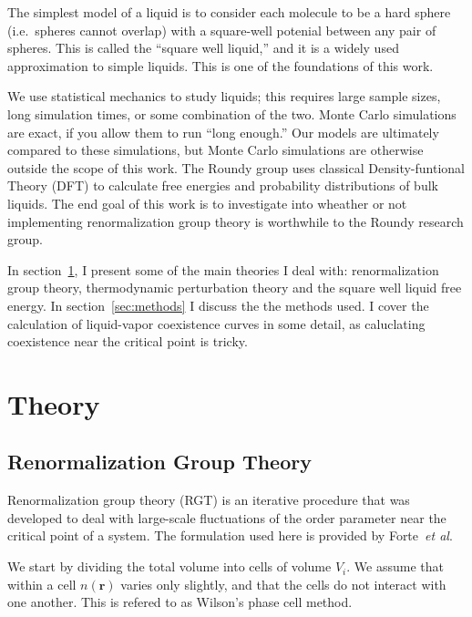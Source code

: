 \documentclass[letterpaper,twocolumn,amsmath,amssymb,prb]{revtex4-1}
\newcommand{\rr}{\ensuremath{\mathbf{r}}}
\newcommand{\1}{\ensuremath{\textbf{r}_1}}
\newcommand{\2}{\ensuremath{\textbf{r}_2}}
\newcommand{\3}{\ensuremath{\textbf{r}_3}}
\newcommand{\4}{\ensuremath{\textbf{r}_4}}
\begin{document}
The simplest model of a liquid is to consider each molecule to be a
hard sphere (i.e.~spheres cannot overlap) with a square-well potenial
between any pair of spheres. This is called the ``square well
liquid,'' and it is a widely used approximation to simple
liquids. This is one of the foundations of this work.

We use statistical mechanics to study liquids; this requires large
sample sizes, long simulation times, or some combination of the
two. Monte Carlo simulations are exact, if you allow them to run
``long enough.'' Our models are ultimately compared to these
simulations, but Monte Carlo simulations are otherwise outside the
scope of this work. The Roundy group uses classical Density-funtional
Theory (DFT) to calculate free energies and probability distributions
of bulk liquids. The end goal of this work is to investigate into
wheather or not implementing renormalization group theory is
worthwhile to the Roundy research group.

In section~\ref{sec:theory}, I present some of the main theories I
deal with: renormalization group theory, thermodynamic perturbation
theory and the square well liquid free energy. In
section~\ref{sec:methods} I discuss the the methods used. I cover the
calculation of liquid-vapor coexistence curves in some detail, as
caluclating coexistence near the critical point is tricky.

\section{Theory}\label{sec:theory}


\subsection{Renormalization Group Theory}\label{subsec:RGT}
Renormalization group theory (RGT) is an iterative procedure that was
developed to deal with large-scale fluctuations of the order parameter
near the critical point of a system. The formulation used here is
provided by Forte~\textit{et al}.\cite{Forte11}

We start by dividing the total volume into cells of volume $V_i$. We
assume that within a cell $n(\rr)$ varies only slightly, and that the
cells do not interact with one another. This is refered to as Wilson's
phase cell method.\cite{Ramana12}
\end{document}
